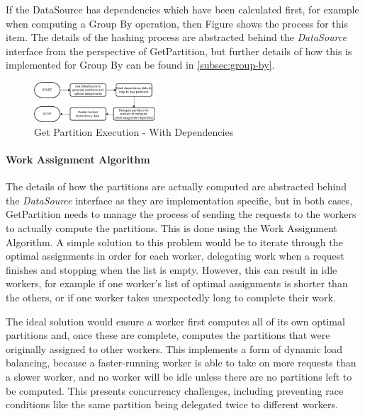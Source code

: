 If the DataSource has dependencies which have been calculated first, for example when computing a Group By operation, then Figure  shows the process for this item. The details of the hashing process are abstracted behind the \textit{DataSource} interface from the perspective of GetPartition, but further details of how this is implemented for Group By can be found in \ref{subsec:group-by}.

\begin{figure}[h]
	\centering
	\includegraphics[width=0.4\textwidth]{chapters/diagrams/implementation/get-partition-dependencies-flow}
	\caption{Get Partition Execution - With Dependencies}
	\label{fig:get-partition-dependencies}
\end{figure}

\paragraph{Work Assignment Algorithm}
The details of how the partitions are actually computed are abstracted behind the \textit{DataSource} interface as they are implementation specific, but in both cases, GetPartition needs to manage the process of sending the requests to the workers to actually compute the partitions. This is done using the Work Assignment Algorithm. A simple solution to this problem would be to iterate through the optimal assignments in order for each worker, delegating work when a request finishes and stopping when the list is empty. However, this can result in idle workers, for example if one worker's list of optimal assignments is shorter than the others, or if one worker takes unexpectedly long to complete their work.

The ideal solution would ensure a worker first computes all of its own optimal partitions and, once these are complete, computes the partitions that were originally assigned to other workers. This implements a form of dynamic load balancing, because a faster-running worker is able to take on more requests than a slower worker, and no worker will be idle unless there are no partitions left to be computed. This presents concurrency challenges, including preventing race conditions like the same partition being delegated twice to different workers.

